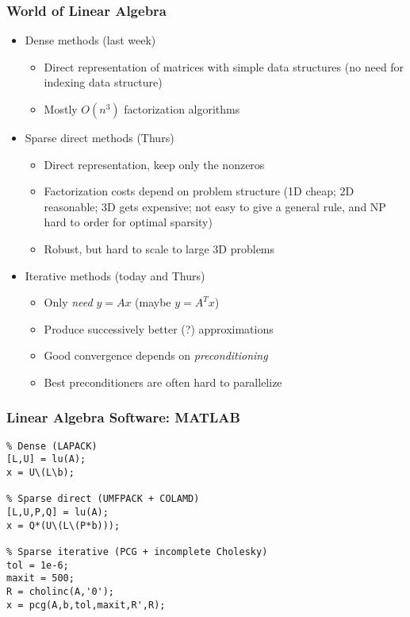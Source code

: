 \documentclass{beamer}
\begin{document}
\begin{frame}
  \titlepage
\end{frame}


\begin{frame}
  \frametitle{World of Linear Algebra}

  \begin{itemize}
  \item Dense methods (last week)
    \begin{itemize}
    \item Direct representation of matrices with
      simple data structures (no need for indexing data structure)
    \item Mostly $O(n^3)$ factorization algorithms
    \end{itemize}
  \item Sparse direct methods (Thurs)
    \begin{itemize}
    \item Direct representation, keep only the nonzeros
    \item Factorization costs depend on problem structure
      (1D cheap; 2D reasonable; 3D gets expensive; not easy to give a general
      rule, and NP hard to order for optimal sparsity)
    \item Robust, but hard to scale to large 3D problems
    \end{itemize}
  \item Iterative methods (today and Thurs)
    \begin{itemize}
    \item Only {\em need} $y = Ax$ (maybe $y = A^T x$)
    \item Produce successively better (?) approximations
    \item Good convergence depends on {\em preconditioning}
    \item Best preconditioners are often hard to parallelize
    \end{itemize}
  \end{itemize}

\end{frame}


\begin{frame}[fragile]
  \frametitle{Linear Algebra Software: MATLAB}
  
\begin{lstlisting}
% Dense (LAPACK)
[L,U] = lu(A);
x = U\(L\b);

% Sparse direct (UMFPACK + COLAMD)
[L,U,P,Q] = lu(A);
x = Q*(U\(L\(P*b)));

% Sparse iterative (PCG + incomplete Cholesky)
tol = 1e-6;
maxit = 500;
R = cholinc(A,'0');
x = pcg(A,b,tol,maxit,R',R);
\end{lstlisting}

\end{frame}
\end{document}
